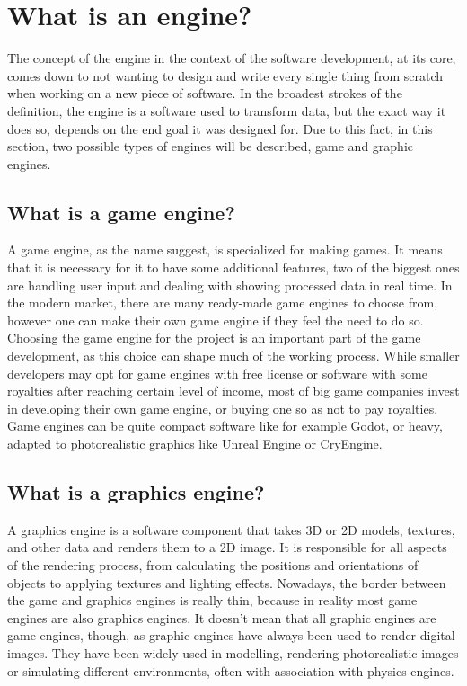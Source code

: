 \newpage
\section{What is an engine?}
\hspace{\parindent}
The concept of the engine in the context of the software development, at its core, comes down to not wanting to design and write every single thing from scratch when working on a new piece of software. In the broadest strokes of the definition, the engine is a software used to transform data, but the exact way it does so, depends on the end goal it was designed for. Due to this fact, in this section, two possible types of engines will be described, game and graphic engines.

\subsection{What is a game engine?}
\hspace{\parindent}
A game engine, as the name suggest, is specialized for making games. It means that it is necessary for it to have some additional features, two of the biggest ones are handling user input and dealing with showing processed data in real time. In the modern market, there are many ready-made game engines to choose from, however one can make their own game engine if they feel the need to do so. Choosing the game engine for the project is an important part of the game development, as this choice can shape much of the working process. While smaller developers may opt for game engines with free license or software with some royalties after reaching certain level of income, most of big game companies invest in developing their own game engine, or buying one so as not to pay royalties. Game engines can be quite compact software like for example Godot, or heavy, adapted to photorealistic graphics like Unreal Engine or CryEngine.

\subsection{What is a graphics engine?}
\hspace{\parindent}
A graphics engine is a software component that takes 3D or 2D models, textures, and other data and renders them to a 2D image. It is responsible for all aspects of the rendering process, from calculating the positions and orientations of objects to applying textures and lighting effects. Nowadays, the border between the game and graphics engines is really thin, because in reality most game engines are also graphics engines. It doesn't mean that all graphic engines are game engines, though, as graphic engines have always been used to render digital images. They have been widely used in modelling, rendering photorealistic images or simulating different environments, often with association with physics engines. 
